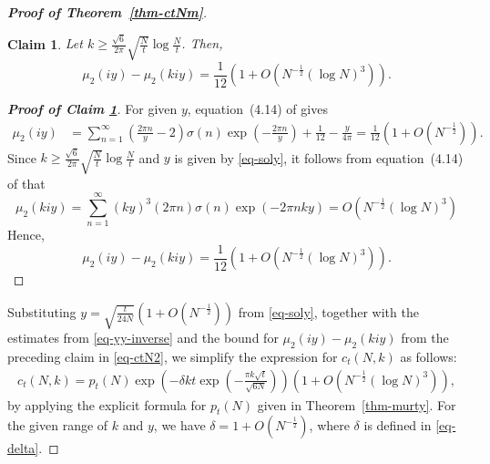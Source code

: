 \documentclass[11pt]{amsart}
\theoremstyle{plain}
\newtheorem{claim}[]{Claim}
\numberwithin{equation}{section}
\begin{document}
\begin{proof}[\textbf{\boldmath Proof of Theorem~\ref{thm-ctNm}}]
		\begin{claim}\label{claim-2}
			Let $k\ge\frac{\sqrt{6}}{2\pi}\sqrt{\frac{N}{t}}\log \frac{N}{t}$. Then,
			\begin{equation*}
				\mu_{2}(iy)-\mu_{2}(kiy)=\frac{1}{12}\left(1+O\left(N^{-\frac{1}{2}}(\log N)^{3}\right)\right).
			\end{equation*} 
		\end{claim}
		\begin{proof}[\textbf{\boldmath Proof of Claim \ref{claim-2}}]
			For given $y$, equation~(4.14) of \cite{tyler} gives
			\begin{align*}
				\mu_{2}(iy)&=\sum_{n=1}^{\infty}\left(\frac{2\pi n}{y}-2\right)\sigma(n) \exp\left(-\frac{2\pi n}{y}\right)+\frac{1}{12}-\frac{y}{4\pi}=\frac{1}{12}\left(1+O\left(N^{-\frac{1}{2}}\right)\right).
			\end{align*}
			Since $k\ge\frac{\sqrt{6}}{2\pi}\sqrt{\frac{N}{t}}\log \frac{N}{t}$ and $y$ is given by \eqref{eq-soly}, it follows from equation~(4.14) of \cite{tyler} that 
			\begin{equation*}
				\mu_{2}(kiy) = \sum_{n=1}^{\infty}(ky)^{3}(2\pi n)\sigma(n)\exp(-2\pi nky)=O\left(N^{-\frac{1}{2}}(\log N)^{3}\right)
			\end{equation*}
			Hence,
			\begin{equation*}
				\mu_{2}(iy)-\mu_{2}(kiy)=\frac{1}{12}\left(1+O\left(N^{-\frac{1}{2}}(\log N)^{3}\right)\right).
			\end{equation*}
		\end{proof}
		Substituting $y = \sqrt{\frac{t}{{24N}}}\left(1+O\left(N^{-\frac{1}{2}}\right)\right)$ from \eqref{eq-soly}, together with the estimates from \eqref{eq-yy-inverse} and the bound for $\mu_{2}(iy)-\mu_{2}(kiy)$ from the preceding claim in \eqref{eq-ctN2}, we simplify the expression for $c_t(N,k)$ as follows:
		\begin{align*}
			c_t(N,k)=p_t(N)\exp\left(-\delta kt\exp\left(-\frac{\pi k\sqrt{t}}{\sqrt{6N}}\right)\right)\left(1+O\left(N^{-\frac{1}{2}}(\log N)^{3}\right)\right),
		\end{align*}
		by applying the explicit formula for $p_t(N)$ given in Theorem~\ref{thm-murty}. For the given range of $k$ and $y$, we have $\delta=1+O(N^{-\frac{1}{2}})$, where $\delta$ is defined in \eqref{eq-delta}.
	\end{proof}
\end{document}
